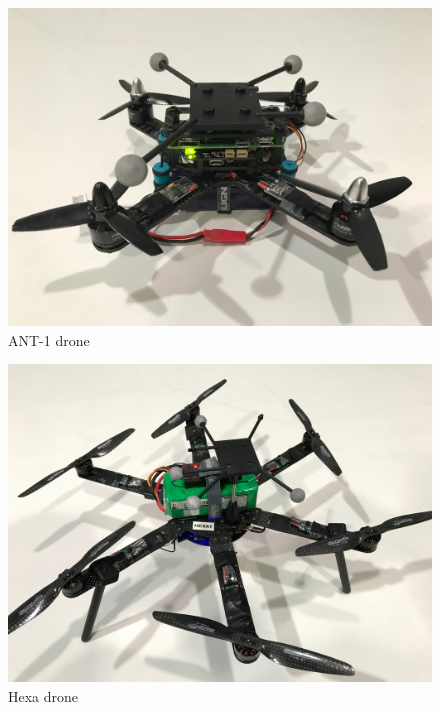 \begin{figure}[!htb]
\centering
\includegraphics[width=0.5\linewidth]{chapters/chapter-02/figures/ant1_1.jpg}
\caption{ANT-1 drone}
\label{fig:ant1}
\end{figure}

\begin{figure}[!htb]
\centering
\includegraphics[width=0.5\linewidth]{chapters/chapter-02/figures/hexa_1.jpg}
\caption{Hexa drone}
\label{fig:hexa}
\end{figure}
